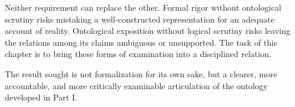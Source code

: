 Neither requirement can replace the other. Formal rigor without
ontological scrutiny risks mistaking a well-constructed representation for
an adequate account of reality. Ontological exposition without logical
scrutiny risks leaving the relations among its claims ambiguous or
unsupported. The task of this chapter is to bring these forms of
examination into a disciplined relation.

The result sought is not formalization for its own sake, but a clearer,
more accountable, and more critically examinable articulation of the
ontology developed in Part I.

